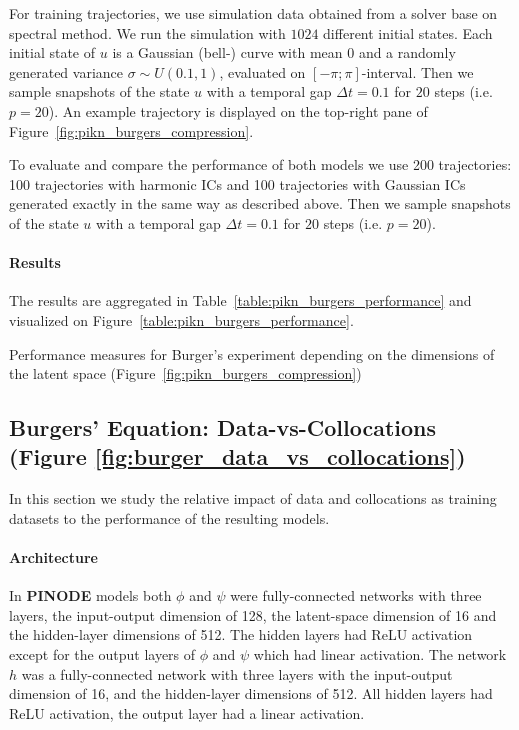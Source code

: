 For training trajectories, we use simulation data obtained from a solver base on spectral method. We run the simulation with $1024$ different initial states. Each initial state of $u$ is a Gaussian (bell-) curve with mean 0 and a randomly generated variance $\sigma \sim U(0.1,1)$, evaluated on $[-\pi; \pi]$-interval. Then we sample snapshots of the state $u$ with a temporal gap $\Delta t=0.1$ for $20$ steps (i.e. $p=20$). An example trajectory is displayed on the top-right pane of Figure~\ref{fig:pikn_burgers_compression}.

To evaluate and compare the performance of both models we use 200 trajectories: 100 trajectories with harmonic ICs and 100 trajectories with Gaussian ICs generated exactly in the same way as described above. Then we sample snapshots of the state $u$ with a temporal gap $\Delta t=0.1$ for $20$ steps (i.e. $p=20$).

\paragraph{Results} 
The results are aggregated in Table~\ref{table:pikn_burgers_performance} and visualized on Figure~\ref{table:pikn_burgers_performance}.

\begin{table}[t!]
    \centering
    \resizebox{\columnwidth}{!}{}
    \caption{Performance measures for Burger's experiment depending on the dimensions of the latent space (Figure~\ref{fig:pikn_burgers_compression})}
    \label{table:pikn_burgers_performance}
\end{table}


\subsection{Burgers' Equation: Data-vs-Collocations (Figure \ref{fig:burger_data_vs_collocations})}
In this section we study the relative impact of data and collocations as training datasets to the performance of the resulting models.
\label{appendix:burgers_data_vs_collocations}
\paragraph{Architecture} In \textbf{PINODE} models both $\phi$ and $\psi$ were fully-connected networks with three layers, the input-output dimension of 128, the latent-space dimension of 16 and the hidden-layer dimensions of 512. The hidden layers had ReLU activation except for the output layers of $\phi$ and $\psi$ which had linear activation. The network $h$ was a fully-connected network with three layers with the input-output dimension of 16, and the hidden-layer dimensions of 512. All hidden layers had ReLU activation, the output layer had a linear activation.

